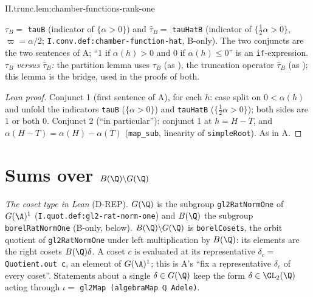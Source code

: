 \begin{lemma}
\end{lemma}
\begin{tfformal}{II.trunc.lem:chamber-functions-rank-one}
\begin{tffidelity}
$\tau_B=$ \texttt{tauB} (indicator of $\{\alpha>0\}$) and $\hat\tau_B=$ \texttt{tauHatB} (indicator of $\{\tfrac12\alpha>0\}$, $\varpi=\alpha/2$; \texttt{I.conv.def:chamber-function-hat}, B-only). The two conjuncts are the two sentences of A; ``$1$ if $\alpha(h)>0$ and $0$ if $\alpha(h)\le0$'' is an \texttt{if}-expression. \emph{$\tau_B$ versus $\hat\tau_B$:} the partition lemma uses $\tau_B$ (as \cite[Lemma~8.2]{AIntro}), the truncation operator $\hat\tau_B$ (as \cite[(13.1)]{AIntro}); this lemma is the bridge, used in the proofs of both.
\end{tffidelity}
\end{tfformal}
\begin{proof}[Lean proof]
Conjunct 1 (first sentence of A), for each $h$: case split on $0<\alpha(h)$ and unfold the indicators \texttt{tauB} ($\{\alpha>0\}$) and \texttt{tauHatB} ($\{\frac12\alpha>0\}$); both sides are $1$ or both $0$. Conjunct 2 (``in particular''): conjunct 1 at $h=H-T$, and $\alpha(H-T)=\alpha(H)-\alpha(T)$ (\texttt{map\_sub}, linearity of \texttt{simpleRoot}). As in A.
\end{proof}


\section{Sums over \texorpdfstring{$B(\Q)\backslash G(\Q)$}{B(Q)\textbackslash G(Q)}}\label{sec:trunc-cosets}

\noindent\emph{The coset type in Lean} (D-REP). $G(\Q)$ is the subgroup \texttt{gl2RatNormOne} of $G(\A)^1$ (\texttt{I.quot.def:gl2-rat-norm-one}) and $B(\Q)$ the subgroup \texttt{borelRatNormOne} (B-only, below). $B(\Q)\backslash G(\Q)$ is \texttt{borelCosets}, the orbit quotient of \texttt{gl2RatNormOne} under left multiplication by $B(\Q)$: its elements are the right cosets $B(\Q)\delta$. A coset $c$ is evaluated at its representative $\delta_c=$ \texttt{Quotient.out c}, an element of $G(\A)^1$; this is A's ``fix a representative $\delta_c$ of every coset''. Statements about a single $\delta\in G(\Q)$ keep the form $\delta\in\GL_2(\Q)$ acting through $\iota=$ \texttt{gl2Map (algebraMap ℚ Adele)}.

